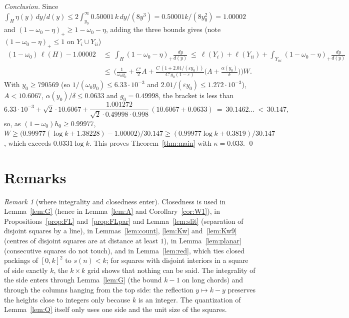 \documentclass[11pt]{amsart}
\theoremstyle{definition}
\theoremstyle{remark}
\newtheorem{remark}[theorem]{Remark}
\begin{document}
\smallskip\noindent\emph{Conclusion.} Since $\int_H\eta(y)\,dy/d(y)\le2\int_{y_0}^\infty0.50001\,k\,dy/(8y^3)=0.50001k/(8y_0^2)=1.00002$
and $(1-\omega_0-\eta)_+\ge1-\omega_0-\eta$, adding the three bounds gives (note $(1-\omega_0-\eta)_+\le1$ on $Y_i\cup Y_{ii}$)
\begin{align*}
(1-\omega_0)\,\ell(H)-1.00002\ &\le\ \int_H(1-\omega_0-\eta)_+\frac{dy}{d(y)}\ \le\ \ell(Y_i)+\ell(Y_{ii})+\int_{Y_{iii}}(1-\omega_0-\eta)_+\frac{dy}{d(y)}\\
&\le\ \Big(\frac1{\omega_0y_0}+\frac{C'}2A+\frac{C\,(1+2.01/(\varepsilon y_0))}{C'g_0(1-\varepsilon)}\Big(A+\frac{\alpha(y_0)}\delta\Big)\Big)W .
\end{align*}
With $y_0\ge790569$ (so $1/(\omega_0y_0)\le6.33\cdot10^{-3}$ and $2.01/(\varepsilon y_0)\le1.272\cdot10^{-3}$), $A<10.6067$,
$\alpha(y_0)/\delta\le0.0633$ and $g_0=0.49998$, the bracket is less than
\[
6.33\cdot10^{-3}+\sqrt2\cdot10.6067+\frac{1.001272}{\sqrt2\cdot0.49998\cdot0.998}\,(10.6067+0.0633)\ =\ 30.1462\ldots\ <\ 30.147,
\]
so, as $(1-\omega_0)h_0\ge0.99977$, $W\ge\big(0.99977(\log k+1.38228)-1.00002\big)/30.147\ge(0.99977\log k+0.3819)/30.147$, which exceeds
$0.0331\log k$. This proves Theorem~\ref{thm:main} with $\kappa=0.033$. \qed

\section{Remarks}

\begin{remark}[where integrality and closedness enter]
Closedness is used in Lemma~\ref{lem:G} (hence in Lemma~\ref{lem:A} and Corollary~\ref{cor:W1}), in
Propositions~\ref{prop:FL} and~\ref{prop:FLpar} and Lemma~\ref{lem:slit} (separation of disjoint squares by a line), in
Lemmas~\ref{lem:count}, \ref{lem:Kw} and~\ref{lem:Kw9} (centres of disjoint squares are at distance at least $1$), in
Lemma~\ref{lem:planar} (consecutive squares do not touch), and in
Lemma~\ref{lem:red}, which ties closed packings of $[0,k]^2$ to $s(n)<k$; for squares with disjoint interiors in a
square of side exactly $k$, the $k\times k$ grid shows that nothing can be said. The integrality of the side enters through
Lemma~\ref{lem:G} (the bound $k-1$ on long chords) and through the columns hanging from the top side: the reflection $y\mapsto k-y$
preserves the heights close to integers only because $k$ is an integer. The quantization of Lemma~\ref{lem:Q} itself only uses one
side and the unit size of the squares.
\end{remark}
\end{document}
